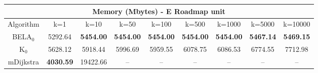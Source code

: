 \begin{tabular}{c|cccccccc}\toprule
\multicolumn{9}{c}{Memory (Mbytes) - E Roadmap unit}\\ \midrule
Algorithm & k=1 & k=10 & k=50 & k=100 & k=500 & k=1000 & k=5000 & k=10000 \\ \midrule
BELA$_0$ & 5292.64 & \textbf{5454.00} & \textbf{5454.00} & \textbf{5454.00} & \textbf{5454.00} & \textbf{5454.00} & \textbf{5467.14} & \textbf{5469.15} \\
K$_0$ & 5628.12 & 5918.44 & 5996.69 & 5959.55 & 6078.75 & 6086.53 & 6774.55 & 7712.98 \\
mDijkstra & \textbf{4030.59} & 19422.66 & -- & -- & -- & -- & -- & -- \\ \bottomrule 
\end{tabular}
